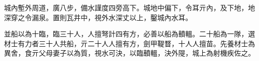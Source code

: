 
\begin{pinyinscope}
城內塹外周道，廣八步，備水謹度四旁高下。城地中偏下，令耳亓內，及下地，地深穿之令漏泉。置則瓦井中，視外水深丈以上，鑿城內水耳。

並船以為十臨，臨三十人，人擅弩計四有方，必善以船為轒轀。二十船為一隊，選材士有力者三十人共船，亓二十人人擅有方，劍甲鞮瞀，十人人擅苗。先養材士為異舍，食亓父母妻子以為質，視水可決，以臨轒轀，決外隄，城上為射機疾佐之。


\end{pinyinscope}